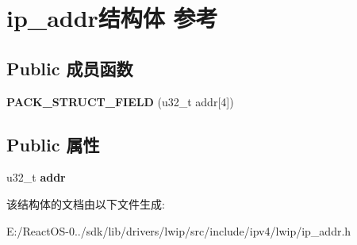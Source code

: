 \hypertarget{structip__addr}{}\section{ip\+\_\+addr结构体 参考}
\label{structip__addr}
\subsection*{Public 成员函数}
\begin{DoxyCompactItemize}
\item 
\mbox{\label{structip__addr_a274dc17c116f0e367d4cd46b8ec52c10}} 
{\bfseries P\+A\+C\+K\+\_\+\+S\+T\+R\+U\+C\+T\+\_\+\+F\+I\+E\+LD} (u32\+\_\+t addr\mbox{[}4\mbox{]})
\end{DoxyCompactItemize}
\subsection*{Public 属性}
\begin{DoxyCompactItemize}
\item 
\mbox{\label{structip__addr_ae21beaba54c79518c4b77b279f744c21}} 
u32\+\_\+t {\bfseries addr}
\end{DoxyCompactItemize}


该结构体的文档由以下文件生成\+:\begin{DoxyCompactItemize}
\item 
E\+:/\+React\+O\+S-\/0../sdk/lib/drivers/lwip/src/include/ipv4/lwip/ip\+\_\+addr.\+h\end{DoxyCompactItemize}

